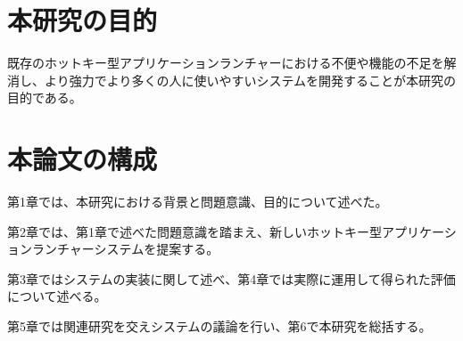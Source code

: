 \section{本研究の目的}
既存のホットキー型アプリケーションランチャーにおける不便や機能の不足を解消し、より強力でより多くの人に使いやすいシステムを開発することが本研究の目的である。

\section{本論文の構成}

第1章では、本研究における背景と問題意識、目的について述べた。

第2章では、第1章で述べた問題意識を踏まえ、新しいホットキー型アプリケーションランチャーシステムを提案する。

第3章ではシステムの実装に関して述べ、第4章では実際に運用して得られた評価について述べる。

第5章では関連研究を交えシステムの議論を行い、第6で本研究を総括する。